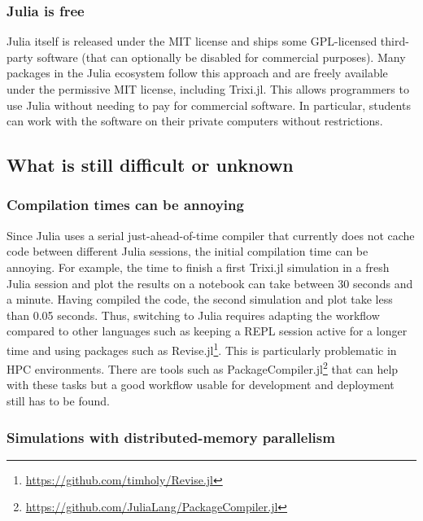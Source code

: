 \documentclass[hidelinks]{juliacon} %
\newcommand{\trixi}{Trixi.jl\xspace}
\begin{document}
\subsubsection{Julia is free}

Julia itself is released under the MIT license and ships some GPL-licensed
third-party software (that can optionally be disabled for commercial purposes).
Many packages in the Julia ecosystem follow this approach and are freely available
under the permissive MIT license, including \trixi. This allows programmers to use Julia
without needing to pay for commercial software. In particular, students can
work with the software on their private computers without restrictions.


\subsection{What is still difficult or unknown}

\subsubsection{Compilation times can be annoying}

Since Julia uses a serial just-ahead-of-time compiler that currently does not cache
code between different Julia sessions, the initial compilation time can be
annoying. For example, the time to finish a first \trixi simulation in a fresh Julia
session and plot the results on a notebook can take between 30 seconds and a
minute. Having compiled the code, the second simulation and plot take less than
0.05 seconds. Thus, switching to Julia requires adapting the workflow compared
to other languages such as keeping a REPL session active for a longer time and
using packages such as Revise.jl\footnote{\url{https://github.com/timholy/Revise.jl}}.
This is particularly problematic in HPC environments. There are tools such as
PackageCompiler.jl\footnote{\url{https://github.com/JuliaLang/PackageCompiler.jl}}
that can help with these tasks but a good workflow usable for development and
deployment still has to be found.

\subsubsection{Simulations with distributed-memory parallelism}
\label{sec:distributed-memory}
\end{document}
